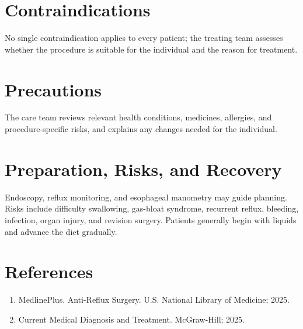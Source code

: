 \section*{Contraindications}
No single contraindication applies to every patient; the treating team assesses whether the procedure is suitable for the individual and the reason for treatment.

\section*{Precautions}
The care team reviews relevant health conditions, medicines, allergies, and procedure-specific risks, and explains any changes needed for the individual.

\section*{Preparation, Risks, and Recovery}
Endoscopy, reflux monitoring, and esophageal manometry may guide planning. Risks include difficulty swallowing, gas-bloat syndrome, recurrent reflux, bleeding, infection, organ injury, and revision surgery. Patients generally begin with liquids and advance the diet gradually.

\section*{References}
\begin{enumerate}
  \item MedlinePlus. Anti-Reflux Surgery. U.S. National Library of Medicine; 2025.
  \item Current Medical Diagnosis and Treatment. McGraw-Hill; 2025.
\end{enumerate}

\clearpage
